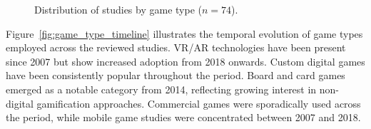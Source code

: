 \documentclass[a4paper,fleqn]{cas-sc}
\begin{document}
\begin{figure}[ht!]
\centering
{}
\caption{Distribution of studies by game type ($n=74$).}
\label{fig:game_type}
\end{figure}

Figure~\ref{fig:game_type_timeline} illustrates the temporal evolution of game types employed across the reviewed studies. VR/AR technologies have been present since 2007 but show increased adoption from 2018 onwards. Custom digital games have been consistently popular throughout the period. Board and card games emerged as a notable category from 2014, reflecting growing interest in non-digital gamification approaches. Commercial games were sporadically used across the period, while mobile game studies were concentrated between 2007 and 2018.
\end{document}
